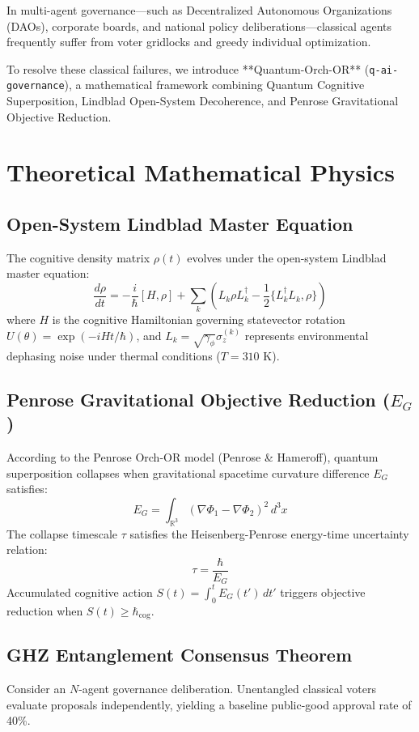 \documentclass[aps,pre,twocolumn,groupedaddress,amsmath,amssymb,showpacs,floatfix]{revtex4-2}
\begin{document}
In multi-agent governance—such as Decentralized Autonomous Organizations (DAOs), corporate boards, and national policy deliberations—classical agents frequently suffer from voter gridlocks and greedy individual optimization. 

To resolve these classical failures, we introduce **Quantum-Orch-OR** (\texttt{q-ai-governance}), a mathematical framework combining Quantum Cognitive Superposition, Lindblad Open-System Decoherence, and Penrose Gravitational Objective Reduction.

\section{Theoretical Mathematical Physics}

\subsection{Open-System Lindblad Master Equation}
The cognitive density matrix $\rho(t)$ evolves under the open-system Lindblad master equation:
\begin{equation}
\frac{d\rho}{dt} = -\frac{i}{\hbar}[H, \rho] + \sum_k \left( L_k \rho L_k^\dagger - \frac{1}{2} \{L_k^\dagger L_k, \rho\} \right)
\end{equation}
where $H$ is the cognitive Hamiltonian governing statevector rotation $U(\theta) = \exp(-i H t / \hbar)$, and $L_k = \sqrt{\gamma_\phi} \sigma_z^{(k)}$ represents environmental dephasing noise under thermal conditions ($T = 310\text{ K}$).

\subsection{Penrose Gravitational Objective Reduction ($E_G$)}
According to the Penrose Orch-OR model (Penrose \& Hameroff), quantum superposition collapses when gravitational spacetime curvature difference $E_G$ satisfies:
\begin{equation}
E_G = \int_{\mathbb{R}^3} (\nabla \Phi_1 - \nabla \Phi_2)^2 \, d^3x
\end{equation}
The collapse timescale $\tau$ satisfies the Heisenberg-Penrose energy-time uncertainty relation:
\begin{equation}
\tau = \frac{\hbar}{E_G}
\end{equation}
Accumulated cognitive action $S(t) = \int_0^t E_G(t') \, dt'$ triggers objective reduction when $S(t) \ge \hbar_{\text{cog}}$.

\subsection{GHZ Entanglement Consensus Theorem}
Consider an $N$-agent governance deliberation. Unentangled classical voters evaluate proposals independently, yielding a baseline public-good approval rate of 40\%. 
\end{document}
